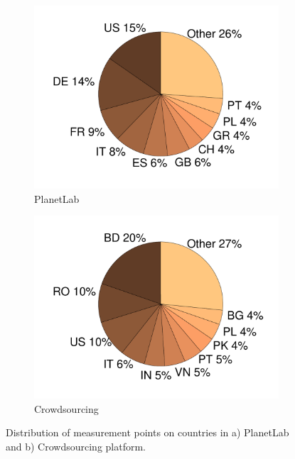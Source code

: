 \begin{figure}[bt]
    \centering
	\begin{subfigure}[t]{0.49\textwidth}
	\includegraphics[width=\textwidth]{aslevel/crowd/results/figs/PLSrc.pdf}
\caption{PlanetLab}
\label{fig:PLSrc}
\end{subfigure}
\begin{subfigure}[t]{0.49\textwidth}
	\includegraphics[width=\textwidth]{aslevel/crowd/results/figs/MWSrc.pdf}
\caption{Crowdsourcing}
 	\label{fig:MWSrc}
\end{subfigure}
    \caption{Distribution of measurement points on countries in a) PlanetLab and b) Crowdsourcing platform.}
    \label{fig:Src}
\end{figure}

